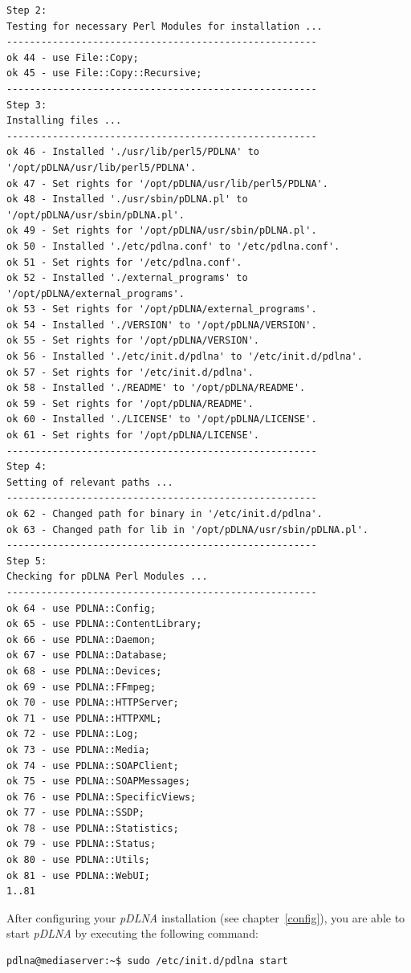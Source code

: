 \documentclass[a4paper,oneside,10pt]{report}
\newenvironment{colframecmd}{%
  \begin{Sbox}
    \begin{minipage}{.99\columnwidth}
}{%
  \end{minipage}
  \end{Sbox}
  \begin{center}
    \fcolorbox{black}{LightSteelBlue}{\TheSbox}
  \end{center}
}
\begin{document}
\begin{colframecmd}
\begin{verbatim}
Step 2:
Testing for necessary Perl Modules for installation ...
------------------------------------------------------
ok 44 - use File::Copy;
ok 45 - use File::Copy::Recursive;
------------------------------------------------------
Step 3:
Installing files ...
------------------------------------------------------
ok 46 - Installed './usr/lib/perl5/PDLNA' to '/opt/pDLNA/usr/lib/perl5/PDLNA'.
ok 47 - Set rights for '/opt/pDLNA/usr/lib/perl5/PDLNA'.
ok 48 - Installed './usr/sbin/pDLNA.pl' to '/opt/pDLNA/usr/sbin/pDLNA.pl'.
ok 49 - Set rights for '/opt/pDLNA/usr/sbin/pDLNA.pl'.
ok 50 - Installed './etc/pdlna.conf' to '/etc/pdlna.conf'.
ok 51 - Set rights for '/etc/pdlna.conf'.
ok 52 - Installed './external_programs' to '/opt/pDLNA/external_programs'.
ok 53 - Set rights for '/opt/pDLNA/external_programs'.
ok 54 - Installed './VERSION' to '/opt/pDLNA/VERSION'.
ok 55 - Set rights for '/opt/pDLNA/VERSION'.
ok 56 - Installed './etc/init.d/pdlna' to '/etc/init.d/pdlna'.
ok 57 - Set rights for '/etc/init.d/pdlna'.
ok 58 - Installed './README' to '/opt/pDLNA/README'.
ok 59 - Set rights for '/opt/pDLNA/README'.
ok 60 - Installed './LICENSE' to '/opt/pDLNA/LICENSE'.
ok 61 - Set rights for '/opt/pDLNA/LICENSE'.
------------------------------------------------------
Step 4:
Setting of relevant paths ...
------------------------------------------------------
ok 62 - Changed path for binary in '/etc/init.d/pdlna'.
ok 63 - Changed path for lib in '/opt/pDLNA/usr/sbin/pDLNA.pl'.
------------------------------------------------------
Step 5:
Checking for pDLNA Perl Modules ...
------------------------------------------------------
ok 64 - use PDLNA::Config;
ok 65 - use PDLNA::ContentLibrary;
ok 66 - use PDLNA::Daemon;
ok 67 - use PDLNA::Database;
ok 68 - use PDLNA::Devices;
ok 69 - use PDLNA::FFmpeg;
ok 70 - use PDLNA::HTTPServer;
ok 71 - use PDLNA::HTTPXML;
ok 72 - use PDLNA::Log;
ok 73 - use PDLNA::Media;
ok 74 - use PDLNA::SOAPClient;
ok 75 - use PDLNA::SOAPMessages;
ok 76 - use PDLNA::SpecificViews;
ok 77 - use PDLNA::SSDP;
ok 78 - use PDLNA::Statistics;
ok 79 - use PDLNA::Status;
ok 80 - use PDLNA::Utils;
ok 81 - use PDLNA::WebUI;
1..81
\end{verbatim}
\end{colframecmd}

After configuring your {\em pDLNA} installation (see chapter~\ref{config}), you are able to start {\em pDLNA} by executing the following command:
\begin{colframecmd}
\begin{verbatim}
pdlna@mediaserver:~$ sudo /etc/init.d/pdlna start
\end{verbatim}
\end{colframecmd}
\end{document}
